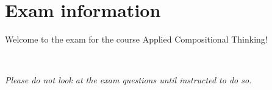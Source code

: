 \documentclass[paper=8.125in:10.250in,pagesize=pdftex,
    headinclude=false,footinclude=false,oneside,egregdoesnotlikesansseriftitles]{kaobook}
\begin{document}
%
%
%
%
%
%
%
%
%
%
%
%
%
%


\section*{Exam information}


Welcome to the exam for the course Applied Compositional Thinking! 

\

\emph{Please do not look at the exam questions until instructed to do so.}

\
\end{document}
